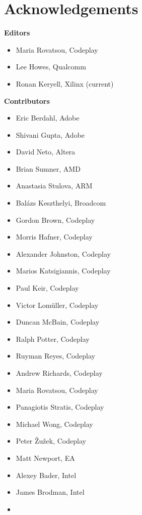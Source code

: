 \chapter{Acknowledgements}

\noindent\textbf{Editors}

\begin{itemize}
\item Maria Rovatsou, Codeplay
\item Lee Howes, Qualcomm
\item Ronan Keryell, Xilinx (current)
\end{itemize}


\noindent\textbf{Contributors}

\begin{multicols}{2}
\begin{itemize}
\item
    Eric Berdahl, Adobe
\item
    Shivani Gupta, Adobe
\item
    David Neto, Altera
\item
    Brian Sumner, AMD
\item
    Anastasia Stulova, ARM
\item
    Bal\'azs Keszthelyi, Broadcom
\item
    Gordon Brown, Codeplay
\item
    Morris Hafner, Codeplay
\item
    Alexander Johnston, Codeplay
\item
    Marios Katsigiannis, Codeplay
\item
    Paul Keir, Codeplay
\item
    Victor Lom\"uller, Codeplay
\item
    Duncan McBain, Codeplay
\item
    Ralph Potter, Codeplay
\item
    Ruyman Reyes, Codeplay
\item
    Andrew Richards, Codeplay
\item
    Maria Rovatsou, Codeplay
\item
    Panagiotis Stratis, Codeplay
\item
    Michael Wong, Codeplay
\item
    Peter {\v Z}u{\v z}ek, Codeplay
\item
    Matt Newport, EA
\item
    Alexey Bader, Intel
\item
    James Brodman, Intel
\item

\end{itemize}
\end{multicols}
